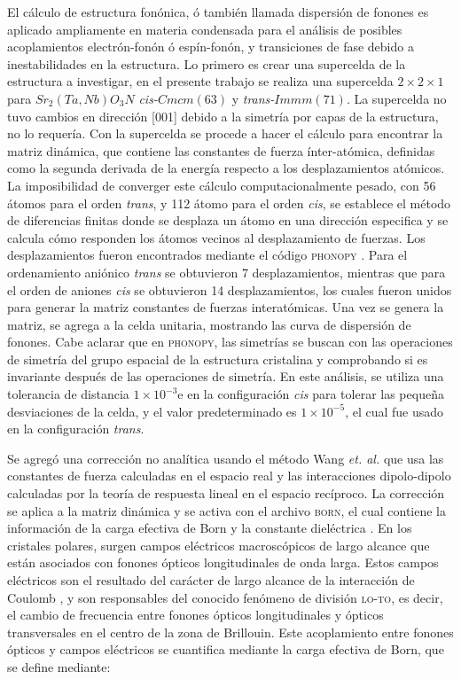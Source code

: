 El cálculo de estructura fonónica, ó también llamada dispersión de fonones es aplicado ampliamente en materia condensada para el análisis de posibles acoplamientos electrón-fonón ó espín-fonón, y transiciones de fase debido a inestabilidades en la estructura. Lo primero es crear una supercelda de la estructura a investigar, en el presente trabajo se realiza una supercelda $2\times2\times1$ para $Sr_{2}(Ta,Nb)O_{3}N$ \emph{cis-}$Cmcm(63)$ y \emph{trans-}$Immm(71)$. La supercelda no tuvo cambios en dirección [001] debido a la simetría por capas de la estructura, no lo requería. Con la supercelda se procede a hacer el cálculo para encontrar la matriz dinámica, que contiene las constantes de fuerza ínter-atómica, definidas como la segunda derivada de la energía respecto a los desplazamientos atómicos. La imposibilidad de converger este cálculo computacionalmente pesado, con 56 átomos para el orden \emph{trans}, y 112 átomo para el orden \emph{cis}, se establece el método de diferencias finitas donde se desplaza un átomo en una dirección especifica y se calcula cómo responden los átomos vecinos al desplazamiento de fuerzas. Los desplazamientos fueron encontrados mediante el código \textsc{phonopy} \cite{Togo2015phonopy}. Para el ordenamiento aniónico \emph{trans} se obtuvieron 7 desplazamientos, mientras que para el orden de aniones \emph{cis} se obtuvieron 14 desplazamientos, los cuales fueron unidos para generar la matriz constantes de fuerzas interatómicas. Una vez se genera la matriz, se agrega a la celda unitaria, mostrando las curva de dispersión de fonones. Cabe aclarar que en \textsc{phonopy}, las simetrías se buscan con las operaciones de simetría del grupo espacial de la estructura cristalina y comprobando si es invariante después de las operaciones de simetría. En este análisis, se utiliza una tolerancia de distancia $1\times10^{-3}$e en la configuración \emph{cis} para tolerar las pequeña desviaciones de la celda, y el valor predeterminado es $1\times10^{-5}$, el cual fue usado en la configuración \emph{trans}. 

Se agregó una corrección no analítica usando el método Wang \textit{et. al.} \cite{Wang_2010-nac} que usa las constantes de fuerza calculadas en el espacio real y las interacciones dipolo-dipolo calculadas por la teoría de respuesta lineal en el espacio recíproco. La corrección se aplica a la matriz dinámica y se activa con el archivo \textsc{born}, el cual contiene la información de la carga efectiva de Born y la constante dieléctrica \cite{Pick1970Aproximation}. En los cristales polares, surgen campos eléctricos macroscópicos de largo alcance que están asociados con fonones ópticos longitudinales de onda larga. Estos campos eléctricos son el resultado del carácter de largo alcance de la interacción de Coulomb \cite{Baroni2001theory}, y son responsables del conocido fenómeno de división \textsc{lo-to}, es decir, el cambio de frecuencia entre fonones ópticos longitudinales y ópticos transversales en el centro de la zona de Brillouin. Este acoplamiento entre fonones ópticos y campos eléctricos se cuantifica mediante la carga efectiva de Born, que se define mediante:

